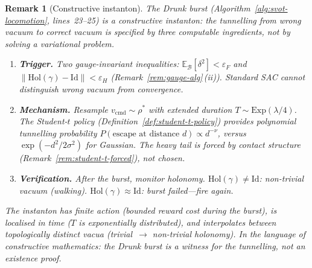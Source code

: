 \documentclass[11pt,a4paper]{article}
\newtheorem{remark}[theorem]{Remark}
\newcommand{\cB}{\mathcal{B}}
\newcommand{\norm}[1]{\lVert #1 \rVert}
\begin{document}
\begin{remark}[Constructive instanton]
\label{rem:constructive-instanton}
The Drunk burst
(Algorithm~\ref{alg:svot-locomotion}, lines~23--25)
is a \emph{constructive instanton}:
the tunnelling from wrong vacuum to correct vacuum
is specified by three computable ingredients,
not by solving a variational problem.
\begin{enumerate}[nosep]
\item \textbf{Trigger.}\;
  Two gauge-invariant inequalities:
  $\mathbb{E}_\cB[\delta^2] < \varepsilon_F$
  and
  $\norm{\mathrm{Hol}(\gamma) - \mathrm{Id}} < \varepsilon_H$
  (Remark~\ref{rem:gauge-alg}\,(ii)).
  Standard SAC cannot distinguish
  wrong vacuum from convergence.
\item \textbf{Mechanism.}\;
  Resample $v_{\mathrm{cmd}} \sim \rho^*$
  with extended duration
  $T \sim \mathrm{Exp}(\lambda/4)$.
  The Student-$t$ policy
  (Definition~\ref{def:student-t-policy})
  provides polynomial tunnelling probability
  $P(\text{escape at distance } d)
    \propto d^{-\nu}$,
  versus $\exp(-d^2/2\sigma^2)$ for Gaussian.
  The heavy tail is forced by
  contact structure
  (Remark~\ref{rem:student-t-forced}),
  not chosen.
\item \textbf{Verification.}\;
  After the burst, monitor holonomy.
  $\mathrm{Hol}(\gamma) \neq \mathrm{Id}$:
  non-trivial vacuum (walking).
  $\mathrm{Hol}(\gamma) \approx \mathrm{Id}$:
  burst failed---fire again.
\end{enumerate}
The instanton has finite action
(bounded reward cost during the burst),
is localised in time
($T$ is exponentially distributed),
and interpolates between
topologically distinct vacua
(trivial~$\to$ non-trivial holonomy).
In the language of constructive mathematics:
the Drunk burst is a \emph{witness}
for the tunnelling,
not an existence proof.
\end{remark}
\end{document}
